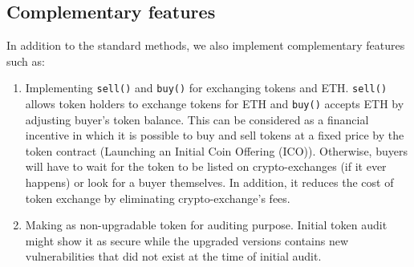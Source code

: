{\subsection{Complementary features}
In addition to the standard \erc methods, we also implement complementary features such as:
\begin{enumerate}[noitemsep,topsep=0pt]
	\item Implementing \texttt{sell()} and \texttt{buy()} for exchanging tokens and ETH. \texttt{sell()} allows token holders to exchange tokens for ETH and \texttt{buy()} accepts ETH by adjusting buyer's token balance. {\blue This can be considered as a financial incentive in which it is possible to buy and sell tokens at a fixed price by the token contract (\eg Launching an Initial Coin Offering (ICO)). Otherwise, buyers will have to wait for the token to be listed on crypto-exchanges (if it ever happens) or look for a buyer themselves. In addition, it reduces the cost of token exchange by eliminating crypto-exchange's fees.}
	\item Making \sys as non-upgradable token for auditing purpose. Initial token audit might show it as secure while the upgraded versions contains new vulnerabilities that did not exist at the time of initial audit.
\end{enumerate}

}

